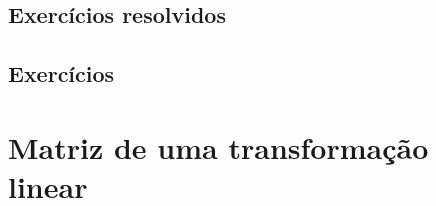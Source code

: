 \documentclass[../livro.tex]{subfiles}
\begin{document}
\subsection*{Exercícios resolvidos}

\construirExeresol

\subsection*{Exercícios}

\construirExer



\section{Matriz de uma transformação linear}
\end{document}
